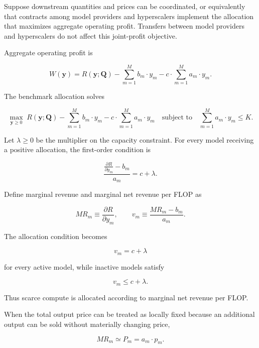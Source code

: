 \documentclass[11pt]{article}
\begin{document}
Suppose downstream quantities and prices can be coordinated, or equivalently that contracts among model providers and hyperscalers implement the allocation that maximizes aggregate operating profit. Transfers between model providers and hyperscalers do not affect this joint-profit objective.

Aggregate operating profit is

\begin{equation}W(\mathbf y)=R(\mathbf y;\mathbf Q)-\sum_{m=1}^{M}b_m\cdot y_m-c\cdot\sum_{m=1}^{M}a_m\cdot y_m.\end{equation}

The benchmark allocation solves

\begin{equation}\max_{\mathbf y\geq0}\;R(\mathbf y;\mathbf Q)-\sum_{m=1}^{M}b_m\cdot y_m-c\cdot\sum_{m=1}^{M}a_m\cdot y_m\quad\text{subject to}\quad\sum_{m=1}^{M}a_m\cdot y_m\leq K.\end{equation}

Let $\lambda\geq0$ be the multiplier on the capacity constraint. For every model receiving a positive allocation, the first-order condition is

\begin{equation}\frac{\frac{\partial R}{\partial y_m}-b_m}{a_m}=c+\lambda.\end{equation}

Define marginal revenue and marginal net revenue per FLOP as

\begin{equation}MR_m\equiv\frac{\partial R}{\partial y_m},\qquad v_m\equiv\frac{MR_m-b_m}{a_m}.\end{equation}

The allocation condition becomes

\begin{equation}\boxed{v_m=c+\lambda}\end{equation}

for every active model, while inactive models satisfy

\begin{equation}v_m\leq c+\lambda.\end{equation}

Thus scarce compute is allocated according to marginal net revenue per FLOP.

When the total output price can be treated as locally fixed because an additional output can be sold without materially changing price,

\begin{equation}MR_m\simeq P_m=a_m\cdot p_m.\end{equation}
\end{document}
